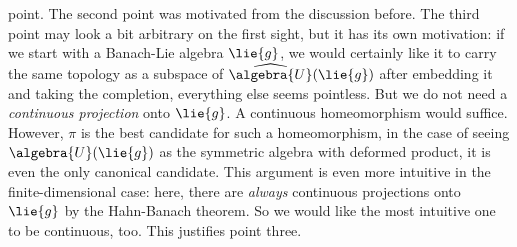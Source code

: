 \documentclass[
11pt,                          %
english                        %
]{article}
\begin{document}
point. The second point was motivated from the discussion before. The third point 
may look a bit arbitrary on the first sight, but it has its own motivation: if we 
start with a Banach-Lie algebra $\lie{g}$, we would certainly like it to carry the 
same topology as a subspace of $\widehat{\algebra{U}}(\lie{g})$ after embedding it 
and taking the completion, everything else seems pointless. But we do not need a 
\emph{continuous projection} onto $\lie{g}$. A continuous homeomorphism would 
suffice. However, $\pi$ is the best candidate for such a homeomorphism, in the case 
of seeing $\algebra{U}(\lie{g})$ as the symmetric algebra with deformed product, it 
is even the only canonical candidate. This argument is even more intuitive in the 
finite-dimensional case: here, there are \emph{always} continuous projections onto 
$\lie{g}$ by the Hahn-Banach theorem. So we would like the most intuitive one to be 
continuous, too. This justifies point three.
\end{document}
